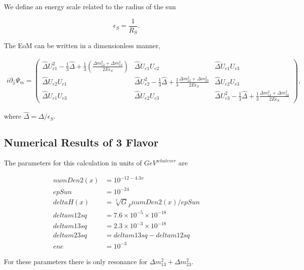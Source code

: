 \documentclass{tufte-handout}
\begin{document}
We define an energy scale related to the radius of the sun

\begin{equation*}
\epsilon_S = \frac{1}{R_S}.
\end{equation*}

The EoM can be written in a dimensionless manner,

\begin{align*}
i\partial_{\hat x} \Psi_{m} =  \begin{pmatrix}
\hat\Delta U_{e1}^2 - \frac{1}{3}\hat\Delta + \frac{1}{3}(\frac{\Delta m_{12}^2 + \Delta m_{13}^2}{2E\epsilon_S}) & \hat\Delta U_{e1}U_{e2} & \hat\Delta U_{e1} U_{e3} \\
\hat\Delta U_{e2} U_{e1} & \hat\Delta U_{e2}^2 -\frac{1}{3}\hat\Delta + \frac{1}{3}\frac{\Delta m_{12}^2 + \Delta m_{23}^2}{2E\epsilon_S} & \hat\Delta U_{e2}U_{e3} \\
\hat\Delta U_{e1} U_{e3} & \hat\Delta U_{e2} U_{e3} & \hat\Delta U_{e3}^2 -\frac{1}{3} \hat\Delta + \frac{1}{3} \frac{\Delta m_{13}^2 + \Delta m_{23}^2 }{2E\epsilon_S} 
\end{pmatrix},
\end{align*}

where $\hat\Delta = \Delta/\epsilon_S$.


\subsection{Numerical Results of 3 Flavor}


The parameters for this calculation in units of $GeV^{whatever}$ are

\begin{align*}
numDen2(x) &= 10^{-12 - 4.3 x} \\
epSun &= 10^{-24}\\
deltaH(x) &= \sqrt[2] G_F numDen2(x)/epSun\\
deltam12sq &= 7.6\times 10^{-5}\times 10^{-18}\\
deltam13sq &= 2.3\times 10^{-3}\times 10^{-18}\\
deltam23sq &= deltam13sq - deltam12sq\\
ene &= 10^{-3}
\end{align*}

For these parameters there is only resonance for $\Delta m_{13}^2+\Delta m_{23}^2$.
\end{document}

